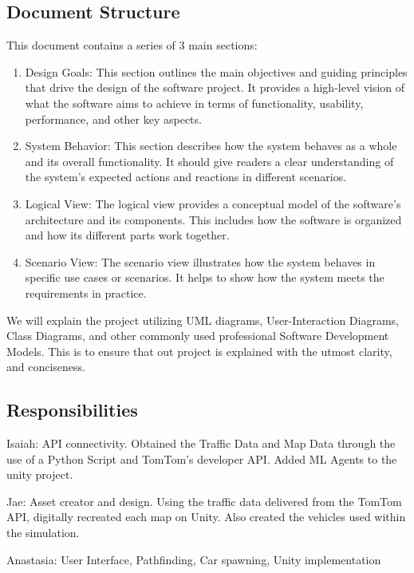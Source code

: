 \subsection{Document Structure}

This document contains a series of 3 main sections:
\begin{enumerate}
    \item Design Goals: This section outlines the main objectives and guiding principles that drive the design of the software project. 
    It provides a high-level vision of what the software aims to achieve in terms of functionality, usability, performance, and other key aspects.
    
    \item System Behavior: This section describes how the system behaves as a whole and its overall functionality. 
    It should give readers a clear understanding of the system's expected actions and reactions in different scenarios.
    
    \item Logical View: The logical view provides a conceptual model of the software's architecture and its components. 
    This includes how the software is organized and how its different parts work together.

    \item Scenario View: The scenario view illustrates how the system behaves in specific use cases or scenarios. 
    It helps to show how the system meets the requirements in practice.
\end{enumerate}

We will explain the project utilizing UML diagrams, User-Interaction Diagrams, Class Diagrams, and other commonly used professional Software Development Models.
This is to ensure that out project is explained with the utmost clarity, and conciseness.

\subsection{Responsibilities}

Isaiah: API connectivity.
Obtained the Traffic Data and Map Data through the use of a Python Script and TomTom's developer API.
Added ML Agents to the unity project.

Jae: Asset creator and design.
Using the traffic data delivered from the TomTom API, digitally recreated each map on Unity. Also created the vehicles used within the simulation.

Anastasia: User Interface, Pathfinding, Car spawning, Unity implementation